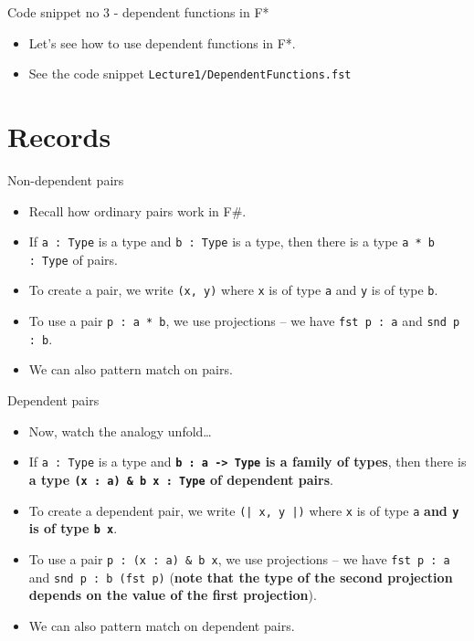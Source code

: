 \documentclass{beamer}
\newcommand{\m}[1]{\texttt{#1}}
\begin{document}
\begin{frame}{Code snippet no 3 - dependent functions in F*}
\begin{itemize}
	\item Let's see how to use dependent functions in F*.
	\item See the code snippet \m{Lecture1/DependentFunctions.fst}
\end{itemize}
\end{frame}

\section{Records}

\begin{frame}{Non-dependent pairs}
\begin{itemize}
	\item Recall how ordinary pairs work in F\#.
	\item If \m{a :\ Type} is a type and \m{b :\ Type} is a type, then there is a type \m{a * b :\ Type} of pairs.
	\item To create a pair, we write \m{(x, y)} where \m{x} is of type \m{a} and \m{y} is of type \m{b}.
	\item To use a pair \m{p :\ a * b}, we use projections -- we have \m{fst p :\ a} and \m{snd p :\ b}.
	\item We can also pattern match on pairs.
\end{itemize}
\end{frame}

\begin{frame}{Dependent pairs}
\begin{itemize}
	\item Now, watch the analogy unfold\dots
	\item If \m{a :\ Type} is a type and \textbf{\m{b :\ a -> Type} is a family of types}, then there is \textbf{a type \m{(x :\ a) \& b x :\ Type} of dependent pairs}.
	\item To create a dependent pair, we write \m{(| x, y |)} where \m{x} is of type \m{a} \textbf{and \m{y} is of type \m{b x}}.
	\item To use a pair \m{p :\ (x :\ a) \& b x}, we use projections -- we have \m{fst p :\ a} and \m{snd p :\ b (fst p)} (\textbf{note that the type of the second projection depends on the value of the first projection}).
	\item We can also pattern match on dependent pairs.
\end{itemize}
\end{frame}
\end{document}
